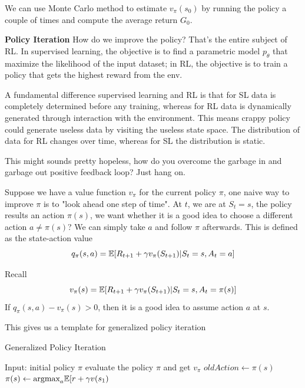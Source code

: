 \documentclass{article}
\begin{document}
We can use Monte Carlo method to estimate $v_{\pi}(s_0)$ by running the 
policy a couple of times and compute the average return $G_0$. 


\textbf{Policy Iteration} How do we improve the policy? That's the entire 
subject of RL. In supervised learning, the objective is to find a parametric
model $p_{\theta}$ that maximize the likelihood of the input dataset;
in RL, the objective is to train a policy that gets the highest reward
from the env. 

A fundamental difference supervised learning and RL is that for SL data is 
completely determined before any training, whereas for RL data is
dynamically generated through interaction with the environment. 
This means crappy policy could generate useless data by visiting
the useless state space. The distribution of data for RL changes over
time, whereas for SL the distribution is static. 

This might sounds pretty hopeless, how do you overcome the garbage in and 
garbage out positive feedback loop? Just hang on.

Suppose we have a value function $v_{\pi}$ for the current policy $\pi$,
one naive way to improve $\pi$ is to "look ahead one step of time". 
At $t$, we are at $S_t=s$, the policy results an action $\pi(s)$, 
we want whether it 
is a good idea to choose a different action $a \neq \pi(s)$? We can simply
take $a$ and follow $\pi$ afterwards. This is defined as the state-action
value 
\[
    q_{\pi}(s, a) = \mathbb{E}[R_{t+1} + \gamma v_{\pi}(S_{t+1}) | S_t=s, A_t=a]
\]

Recall
\[
    v_{\pi}(s) = \mathbb{E}[R_{t+1} + \gamma v_{\pi}(S_{t+1}) | S_t=s, A_t=\pi(s)]
\]
If $q_{\pi}(s, a) - v_{\pi}(s) > 0$, then it is a good idea to assume 
action $a$ at $s$. 

This gives us a template for generalized policy iteration

\begin{algorithm}[H]
    \caption{Generalized Policy Iteration}
\end{algorithm}

\begin{algorithmic}[1]
    \STATE Input: initial policy $\pi$
    \REPEAT
    \STATE evaluate the policy $\pi$ and get $v_{\pi}$
    \STATE $oldAction \leftarrow \pi(s)$
    \STATE $\pi(s) \leftarrow \text{argmax}_a \mathbb{E}[r + \gamma v(s_1)$
    \ENDFOR
\end{algorithmic}
\end{document}
